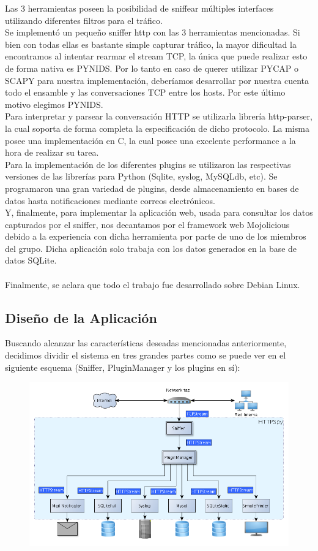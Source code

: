 Las 3 herramientas poseen la posibilidad de sniffear múltiples interfaces utilizando diferentes filtros para el tráfico. 
\\Se implementó un pequeño sniffer http con las 3 herramientas mencionadas. Si bien con todas ellas es bastante simple capturar tráfico, la mayor dificultad la encontramos al intentar rearmar el stream TCP, la única que puede realizar esto de forma nativa es PYNIDS. Por lo tanto en caso de querer utilizar PYCAP o SCAPY para nuestra implementación, deberíamos desarrollar por nuestra cuenta todo el ensamble y las conversaciones TCP entre los hosts. Por este último motivo elegimos PYNIDS.
\\Para interpretar y parsear la conversación HTTP se utilizarla librería http-parser, la cual soporta de forma completa la especificación de dicho protocolo. La misma posee una implementación en C, la cual posee una excelente performance a la hora de realizar su tarea.
\\Para la implementación de los diferentes plugins se utilizaron las respectivas versiones de las librerías para Python (Sqlite, syslog, MySQLdb, etc). Se programaron una gran variedad de plugins, desde almacenamiento en bases de datos hasta notificaciones mediante correos electrónicos.
\\Y, finalmente, para implementar la aplicación web, usada para consultar los datos capturados por el sniffer, nos decantamos por el framework web Mojolicious debido a la experiencia con dicha herramienta por parte de uno de los miembros del grupo. Dicha aplicación solo trabaja con los datos generados en la base de datos SQLite.
\\
\\\indent Finalmente, se aclara que todo el trabajo fue desarrollado sobre Debian Linux.

\subsection{Diseño de la Aplicación}

Buscando alcanzar las características deseadas mencionadas anteriormente, decidimos dividir el sistema en tres grandes partes como se puede ver en el siguiente esquema (Sniffer, PluginManager y los plugins en sí):

\begin{figure}[hbtp]
    \centering
	\includegraphics[width=\textwidth]{img/modelo.png}
\end{figure}

